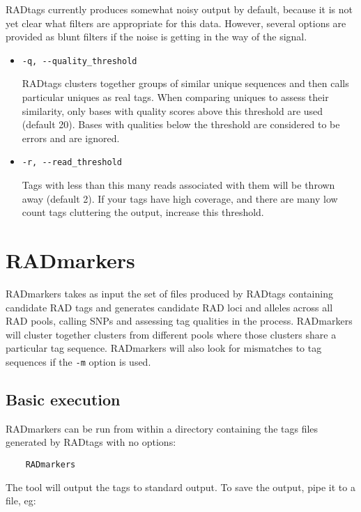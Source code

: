 \documentclass[a4paper]{article}
\begin{document}
RADtags currently produces somewhat noisy output by default, because it is not yet clear what filters are appropriate for this data. However, several options are provided as blunt filters if the noise is getting in the way of the signal.

\begin{itemize}
    \item \verb|-q, --quality_threshold|
    
    RADtags clusters together groups of similar unique sequences and then calls particular uniques as real tags. When comparing uniques to assess their similarity, only bases with quality scores above this threshold are used (default 20). Bases with qualities below the threshold are considered to be errors and are ignored.
    
    \item \verb|-r, --read_threshold|
    
    Tags with less than this many reads associated with them will be thrown away (default 2). If your tags have high coverage, and there are many low count tags cluttering the output, increase this threshold.
    
\end{itemize}


\section{RADmarkers}

RADmarkers takes as input the set of files produced by RADtags containing candidate RAD tags and generates candidate RAD loci and alleles across all RAD pools, calling SNPs and assessing tag qualities in the process. RADmarkers will cluster together clusters from different pools where those clusters share a particular tag sequence. RADmarkers will also look for mismatches to tag sequences if the \verb|-m| option is used.

\subsection{Basic execution}
RADmarkers can be run from within a directory containing the tags files generated by RADtags with no options:

\begin{verbatim}
    RADmarkers
\end{verbatim}

The tool will output the tags to standard output. To save the output, pipe it to a file, eg:
\end{document}
